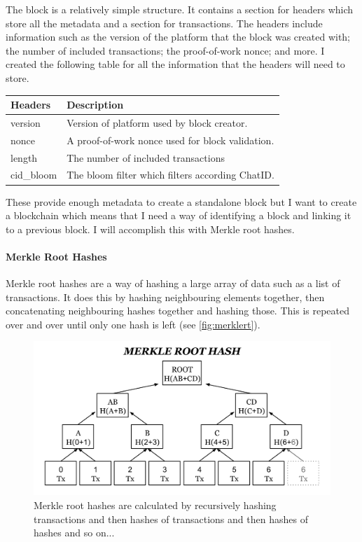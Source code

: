\documentclass{article}
\begin{document}
The block is a relatively simple structure. It contains a section for headers which store all the metadata and a section for transactions. The headers include information such as the version of the platform that the block was created with; the number of included transactions; the proof-of-work nonce; and more. I created the following table for all the information that the headers will need to store.
\begin{table}[h]
\centering
\begin{tabular}{|l|l|}
\hline
\rowcolor{tblgrey} 
Headers    & Description                                       \\ \hline
version    & Version of platform used by block creator.        \\ \hline
nonce      & A proof-of-work nonce used for block validation.  \\ \hline
length     & The number of included transactions               \\ \hline
cid\_bloom & The bloom filter which filters according ChatID.  \\ \hline
\end{tabular}
\end{table}

These provide enough metadata to create a standalone block but I want to create a blockchain which means that I need a way of identifying a block and linking it to a previous block. I will accomplish this with Merkle root hashes.

\paragraph{Merkle Root Hashes}
Merkle root hashes are a way of hashing a large array of data such as a list of transactions. It does this by hashing neighbouring elements together, then concatenating neighbouring hashes together and hashing those. This is repeated over and over until only one hash is left (see \autoref{fig:merklert}).
\begin{figure}[h]
    \centering
    \includegraphics[width=0.95\linewidth]{Images/Diagrams/merkle_root.png}
    \caption{Merkle root hashes are calculated by recursively hashing transactions and then hashes of transactions and then hashes of hashes and so on...}
    \label{fig:merklert}
\end{figure}
\end{document}
